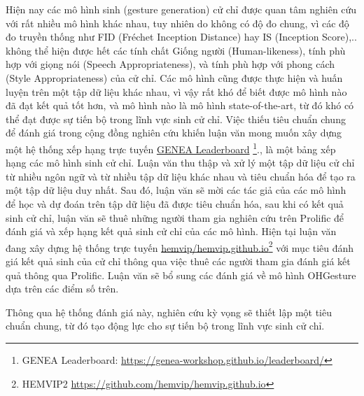 Hiện nay các mô hình sinh (gesture generation) cử chỉ được quan tâm nghiên cứu với rất nhiều mô hình khác nhau, tuy nhiên do không có độ đo chung, vì các độ đo truyền thống như FID (Fréchet Inception Distance) hay IS (Inception Score),.. không thể hiện được hết các tính chất Giống người (Human-likeness), tính phù hợp với giọng nói (Speech Appropriateness), và tính phù hợp với phong cách (Style Appropriateness) của cử chỉ. Các mô hình cũng được thực hiện và huấn luyện trên một tập dữ liệu khác nhau, vì vậy rất khó để biết được mô hình nào đã đạt kết quả tốt hơn, và mô hình nào là mô hình state-of-the-art, từ đó khó có thể đạt được sự tiến bộ trong lĩnh vực sinh cử chỉ. Việc thiếu tiêu chuẩn chung để đánh giá trong cộng đồng nghiên cứu khiến luận văn mong muốn xây dựng một hệ thống xếp hạng trực tuyến \cite{nagy2024towards} \hyperlink{https://genea-workshop.github.io/leaderboard/}{GENEA Leaderboard} \footnote{GENEA Leaderboard: \url{https://genea-workshop.github.io/leaderboard/}}., là một bảng xếp hạng các mô hình sinh cử chỉ. Luận văn thu thập và xử lý một tập dữ liệu cử chỉ từ nhiều ngôn ngữ và từ nhiều tập dữ liệu khác nhau và tiêu chuẩn hóa để tạo ra một tập dữ liệu duy nhất.  Sau đó, luận văn sẽ mời các tác giả của các mô hình để học và dự đoán trên tập dữ liệu đã được tiêu chuẩn hóa, sau khi có kết quả sinh cử chỉ, luận văn sẽ thuê những người tham gia nghiên cứu trên Prolific để đánh giá và xếp hạng kết quả sinh cử chỉ của các mô hình. Hiện tại luận văn đang xây dựng hệ thống trực tuyến \hyperlink{https://github.com/hemvip/hemvip.github.io}{hemvip/hemvip.github.io}\footnote{HEMVIP2 \url{https://github.com/hemvip/hemvip.github.io}} với mục tiêu đánh giá kết quả sinh của cử chỉ thông qua việc thuê các người tham gia đánh giá kết quả thông qua Prolific. Luận văn sẽ bổ sung các đánh giá về mô hình OHGesture dựa trên các điểm số trên.


Thông qua hệ thống đánh giá này, nghiên cứu kỳ vọng sẽ thiết lập một tiêu chuẩn chung, từ đó tạo động lực cho sự tiến bộ trong lĩnh vực sinh cử chỉ.
